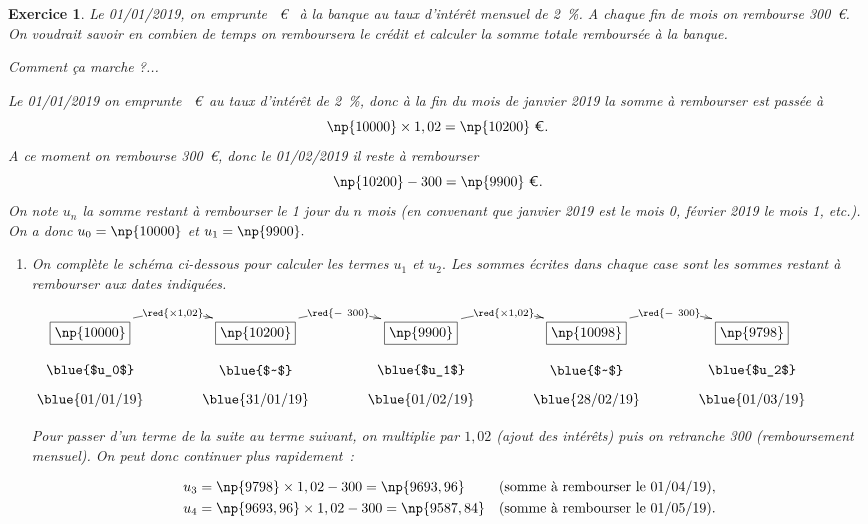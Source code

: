 \documentclass[10pt]{article}
\newtheorem{exo}{Exercice}
\begin{document}
\begin{exo}


Le 01/01/2019, on emprunte ~\euro~{} à la banque au taux d’intérêt mensuel de 2~\%. A chaque fin de mois on rembourse 300~\euro. On voudrait savoir en combien de temps on remboursera le crédit et calculer la somme totale remboursée à la banque.
\medskip

Comment ça marche ?...

Le 01/01/2019 on emprunte ~\euro~au taux d’intérêt de 2~\%, donc à la fin du mois de janvier 2019 la somme à rembourser est passée à
\[\np{10000}\times 1,02=\np{10200}~\text{\euro}.\]
A ce moment on rembourse 300~\euro, donc le 01/02/2019 il reste à rembourser
\[\np{10200}-300=\np{9900}~\text{\euro}.\]
On note $u_n$  la somme restant à rembourser le 1 jour du  $n$ mois (en convenant que janvier 2019 est le mois 0, février 2019 le mois 1, etc.).
On a donc $u_0=\np{10000}$ et $u_1=\np{9900}.$

\begin{enumerate}
\item On complète le schéma ci-dessous pour calculer les termes $u_1$ et $u_2.$ Les sommes écrites dans chaque case sont les sommes restant à rembourser aux dates indiquées.

\medskip

\begin{center}
    $\xymatrix@R=0.5pc@C=3pc{
    *+[F]+{\np{10000}} \ar@/^0.5cm/[r]|{\red{\times 1,02}} & 
    *+[F]+{\np{10200}} \ar@/^0.5cm/[r]|{\red{-~300}} & *+[F]+{\np{9900}}\ar@/^0.5cm/[r]|{\red{\times 1,02}} & *+[F]+{\np{10098}}\ar@/^0.5cm/[r]|{\red{-~300}} & *+[F]+{\np{9798}} \\
    \txt{\blue{$u_0$}}&\txt{\blue{$~$}}&
    \txt{\blue{$u_1$}}&\txt{\blue{$~$}}&\txt{\blue{$u_2$}}\\
    \txt{\blue{01/01/19}}&
    \txt{\blue{31/01/19}}&\txt{\blue{01/02/19}}&
    \txt{\blue{28/02/19}}&\txt{\blue{01/03/19}}
    }$
    \end{center}

Pour passer d'un terme de la suite au terme suivant, on multiplie par $1,02$ (ajout des intérêts) puis on retranche 300 (remboursement mensuel). On peut donc continuer plus rapidement~:

\begin{align*}
u_3&=\np{9798}\times 1,02-300=\np{9693,96}&&\text{(somme à rembourser le 01/04/19)},\\
u_4&=\np{9693,96}\times 1,02-300=\np{9587,84}&&\text{(somme à rembourser le 01/05/19)}
.\end{align*}



\end{enumerate}
\end{exo}
\end{document}
